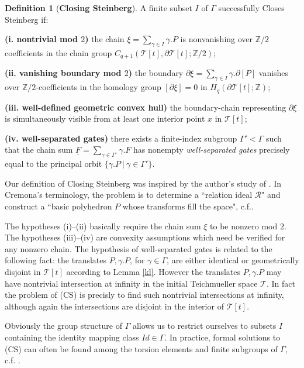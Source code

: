 \documentclass[12pt]{amsart}
\theoremstyle{definition}
\newtheorem{dfn}[thm]{Definition}
\theoremstyle{remark}
\newcommand{\bZ}{\mathbb{Z}}
\newcommand{\del}{\partial}
\newcommand{\uF}{\underline{F}}
\newcommand{\sT}{\mathscr{T}}
\begin{document}
\begin{dfn}[\textbf{Closing Steinberg}]\label{cs}
A finite subset $I$ of $\Gamma$ successfully Closes Steinberg if: 

\textbf{(i. nontrivial mod $2$)} the chain $\xi=\sum_{\gamma\in I} \gamma.P $ is nonvanishing over $\bZ/2$ coefficients in the chain group $C_{q+1}(\sT[t],\del \sT[t];\bZ/2)$;  

\textbf{(ii. vanishing boundary mod $2$)} the boundary $\del \xi=\sum_{\gamma\in I} \gamma.\del [P] $
vanishes over $\bZ/2$-coefficients in the homology group $[\del \xi]=0$ in $H_q(\del \sT[t]; \bZ)$;

\textbf{(iii. well-defined geometric convex hull)} the boundary-chain representing $\del \xi$ is simultaneously visible from at least one interior point $x$ in $\sT[t]$;

\textbf{(iv. well-separated gates)} there exists a finite-index subgroup $\Gamma' < \Gamma$ such that the chain sum $\uF=\sum_{\gamma \in \Gamma'}\gamma.F$ has nonempty \emph{well-separated gates} precisely equal to the principal orbit $\{\gamma.P ~|~ \gamma\in \Gamma'\}$. 
\end{dfn}

Our definition of Closing Steinberg was inspired by the author's study of \cite{Cremona}. In Cremona's terminology, the problem is to determine a ``relation ideal $\mathscr{R}$" and construct a ``basic polyhedron $P$ whose transforms fill the space", c.f.\cite[pp.290]{Cremona}. 


The hypotheses (i)--(ii) basically require the chain sum $\xi$ to be nonzero mod $2$. The hypotheses (iii)--(iv) are convexity assumptions which need be verified for any nonzero chain. The hypothesis of well-separated gates is related to the following fact: the translates $P, \gamma.P$, for $\gamma\in \Gamma$, are either identical or geometrically disjoint in $\sT[t]$ according to Lemma \ref{kl}. However the translates $P, \gamma.P$ may have nontrivial intersection at infinity in the initial Teichmueller space $\sT$. In fact the problem of (CS) is precisly to find such nontrivial intersections at infinity, although again the intersections are disjoint in the interior of $\sT[t]$.

Obviously the group structure of $\Gamma$ allows us to restrict ourselves to subsets $I$ containing the identity mapping class $Id\in \Gamma$. In practice, formal solutions to (CS) can often be found among the torsion elements and finite subgroups of $\Gamma$, c.f. \cite{Cremona}.
\end{document}
